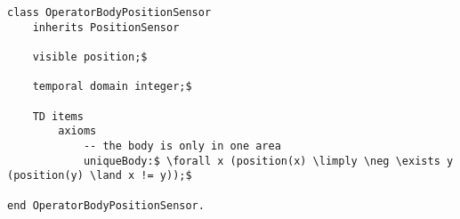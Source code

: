 \begin{lstlisting}[fontadjust, mathescape, frame=tlb] 
class OperatorBodyPositionSensor
    inherits PositionSensor

    visible position;$

    temporal domain integer;$

    TD items
        axioms
            -- the body is only in one area
            uniqueBody:$ \forall x (position(x) \limply \neg \exists y (position(y) \land x != y));$

end OperatorBodyPositionSensor.\end{lstlisting}